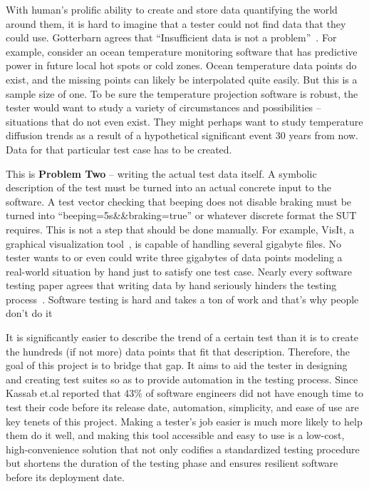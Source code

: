 With human's prolific ability to create and store data quantifying the world around them, it is hard to imagine that a tester could not find data that they could use. Gotterbarn agrees that ``Insufficient data is not a problem''~\cite{Gotterbarn:2016:CFC:2874239.2874248}. For example, consider an ocean temperature monitoring software that has predictive power in future local hot spots or cold zones. Ocean temperature data points do exist, and the missing points can likely be interpolated quite easily. But this is a sample size of one. To be sure the temperature projection software is robust, the tester would want to study a variety of circumstances and possibilities – situations that do not even exist. They might perhaps want to study temperature diffusion trends as a result of a hypothetical significant event 30 years from now. Data for that particular test case has to be created.

This is \textbf{Problem Two} -- writing the actual test data itself. A symbolic description of the test must be turned into an actual concrete input to the software. A test vector checking that beeping does not disable braking must be turned into ``beeping=5s\&\&braking=true'' or whatever discrete format the SUT requires. This is not a step that should be done manually. For example, VisIt, a graphical visualization tool~\cite{VisIt}, is capable of handling several gigabyte files. No tester wants to or even could write three gigabytes of data points modeling a real-world situation by hand just to satisfy one test case. Nearly every software testing paper agrees that writing data by hand seriously hinders the testing process~\cite{Misailovic:2007:PTG:1287624.1287645,Murphy:2007:PRT:1292414.1292425,Palka:2011:TOC:1982595.1982615,Patrick:2016:ATI:2970276.2970333}. Software testing is hard and takes a ton of work and that's why people don't do it~\cite{Langdon:2017:IAT:3105427.3105429,Goffi:2016:AGO:2931037.2931061}

It is significantly easier to describe the trend of a certain test than it is to create the hundreds (if not more) data points that fit that description. Therefore, the goal of this project is to bridge that gap. It aims to aid the tester in designing and creating test suites so as to provide automation in the testing process. Since Kassab et.al reported that 43\% of software engineers did not have enough time to test their code before its release date, automation, simplicity, and ease of use are key tenets of this project. Making a tester's job easier is much more likely to help them do it well, and making this tool accessible and easy to use is a low-cost, high-convenience solution that not only codifies a standardized testing procedure but shortens the duration of the testing phase and ensures resilient software before its deployment date. 